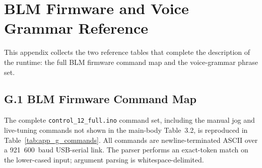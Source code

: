 \cleardoublepage
{}
\chapter{BLM Firmware and Voice Grammar Reference}

This appendix collects the two reference tables that complete the description of the runtime: the full BLM firmware command map and the voice-grammar phrase set.

\section*{G.1 BLM Firmware Command Map}

The complete \texttt{control\_12\_full.ino} command set, including the manual jog and live-tuning commands not shown in the main-body Table~3.2, is reproduced in Table~\ref{tab:app_g_commands}. All commands are newline-terminated ASCII over a 921~600~baud USB-serial link. The parser performs an exact-token match on the lower-cased input; argument parsing is whitespace-delimited.

